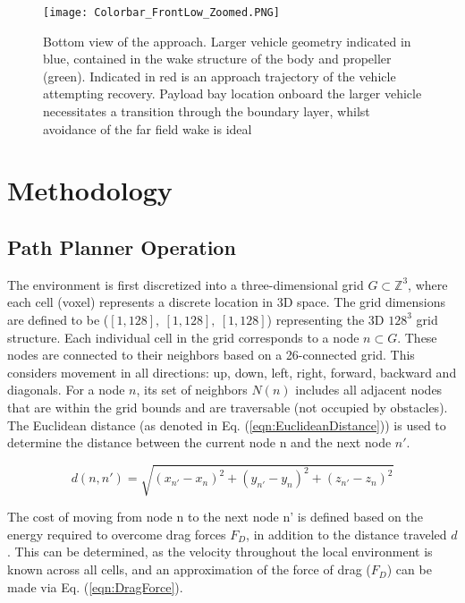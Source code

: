 \documentclass[final,5p,times,twocolumn]{elsarticle}
\begin{document}
\begin{figure}[!htbp]
    \centering
    \texttt{[image: Colorbar\_FrontLow\_Zoomed.PNG]}
    \caption{Bottom view of the approach. Larger vehicle geometry indicated in blue, contained in the wake structure of the body and propeller (green). Indicated in red is an approach trajectory of the vehicle attempting recovery. Payload bay location onboard the larger vehicle necessitates a transition through the boundary layer, whilst avoidance of the far field wake is ideal}
    \label{fig:DomainUnder}
\end{figure}

\section{Methodology} %
\label{Methodology}

\subsection{Path Planner Operation}
\label{Path Planner Operation}
The environment is first discretized into a three-dimensional grid $G \subset \mathbb{Z}^{3}$, where each cell (voxel) represents a discrete location in 3D space. The grid dimensions are defined to be ($[1,128],\ [1,128],\ [1,128]$) representing the 3D $128^{3}$ grid structure. Each individual cell in the grid corresponds to a node $n \subset G$. These nodes are connected to their neighbors based on a 26-connected grid. This considers movement in all directions: up, down, left, right, forward, backward and diagonals. For a node $n$, its set of neighbors $N(n)$ includes all adjacent nodes that are within the grid bounds and are traversable (not occupied by obstacles). The Euclidean distance (as denoted in Eq. (\ref{eqn:EuclideanDistance})) is used to determine the distance between the current node n and the next node $n'$.

\begin{equation}
    \label{eqn:EuclideanDistance}
    d(n, n') = \sqrt{(x_{n'}-x_{n})^{2}+(y_{n'}-y_{n})^{2}+(z_{n'}-z_{n})^{2}}
\end{equation}

The cost of moving from node n to the next node n' is defined based on the energy required to overcome drag forces $F_{D}$, in addition to the distance traveled $d$. This can be determined, as the velocity throughout the local environment is known across all cells, and an approximation of the force of drag ($F_{D}$) can be made via Eq. (\ref{eqn:DragForce}).
\end{document}
